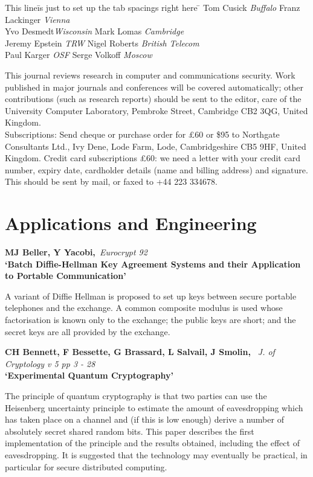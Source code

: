 \begin{tabbing}
This line\=is just to set up the tab spacings right here \= \kill
\>Tom Cusick {\em Buffalo}\> Franz Lackinger {\em Vienna}\\
\>Yvo Desmedt{\em Wisconsin}\> Mark Lomas {\em Cambridge}\\
\>Jeremy Epstein {\em TRW}\> Nigel Roberts {\em British Telecom}\\
\>Paul Karger {\em OSF}\> Serge Volkoff {\em Moscow}\\
\end{tabbing}

\noindent This journal reviews research in computer and communications 
security. Work published in major journals and conferences will be 
covered automatically; other contributions (such as research reports) 
should be sent to the editor, care of the University Computer Laboratory, 
Pembroke Street, Cambridge CB2 3QG, United Kingdom.\\

\noindent Subscriptions: Send cheque or purchase order for \pounds 60 or \$95
to Northgate Consultants Ltd., Ivy Dene, Lode Farm, Lode, Cambridgeshire CB5 
9HF, United Kingdom. Credit card subscriptions \pounds 60: we need a letter
with your credit card number, expiry date, cardholder details (name and 
billing address) and signature. This should be sent by mail, or faxed to +44 
223 334678.\\

\pagebreak
\section{Applications and Engineering}
\small

{\bf \noindent MJ Beller, Y Yacobi,}{\em ~Eurocrypt 92\\}
{\bf `Batch Diffie-Hellman Key Agreement Systems and their Application to
Portable Communication'}

A variant of Diffie Hellman is proposed to set up keys between secure 
portable telephones and the exchange. A common composite modulus is used 
whose factorisation is known only to the exchange; the public keys are
short; and the secret keys are all provided by the exchange.

{\bf \noindent CH Bennett, F Bessette, G Brassard, L Salvail, J Smolin,}
{\em ~J. of Cryptology v 5 pp 3 - 28\\}
{\bf `Experimental Quantum Cryptography'}

The principle of quantum cryptography is that two parties can use the
Heisenberg uncertainty principle to estimate the amount of eavesdropping
which has taken place on a channel and (if this is low enough) derive a
number of absolutely secret shared random bits. This paper describes the 
first implementation of the principle and the results obtained, including
the effect of eavesdropping. It is suggested that the technology may 
eventually be practical, in particular for secure distributed computing.

